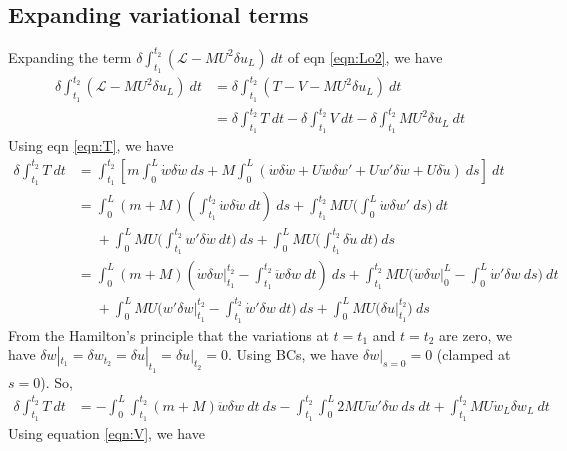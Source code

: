 \documentclass[12pt]{report}
\begin{document}
\subsection{Expanding variational terms}
Expanding the term $\delta \int_{t_1}^{t_2} (\mathcal{L} - MU^2\delta u_L)~dt$ of eqn \ref{eqn:Lo2}, we have
\begin{align*}
  \delta \int_{t_1}^{t_2} (\mathcal{L} - MU^2\delta u_L)~dt &= \delta \int_{t_1}^{t_2} (T - V - MU^2\delta u_L)~dt \\
  &= \delta \int_{t_1}^{t_2} T~dt  - \delta \int_{t_1}^{t_2} V~dt - \delta \int_{t_1}^{t_2} MU^2\delta u_L~dt
\end{align*}
Using eqn \ref{eqn:T}, we have
\begin{align*}
 \delta \int_{t_1}^{t_2} T~dt &= \int_{t_1}^{t_2} \left[m \int_0^L \dot{w}\delta \dot{w}~ds + M\int_0^L \left(\dot{w}\delta \dot{w} + U\dot{w}\delta w' + U w'\delta \dot{w} + U\delta \dot{u}\right)~ds \right]~dt \\
  &=   \int_0^L (m + M)\left(\int_{t_1}^{t_2} \dot{w}\delta \dot{w}~dt\right)~ds + \int_{t_1}^{t_2} MU\bigg(\int_0^L \dot{w}\delta w'~ds\bigg)~dt \\
  &\phantom{=} + \int_0^L MU\bigg(\int_{t_1}^{t_2} w'\delta \dot{w}~dt\bigg)~ds  + \int_0^L MU\bigg(\int_{t_1}^{t_2}\delta \dot{u}~dt\bigg)~ds  \\
  &= \int_0^L (m + M) \left(\dot{w}\delta w\bigg|_{t_1}^{t_2} - \int_{t_1}^{t_2} \ddot{w}\delta w~dt\right)~ds + \int_{t_1}^{t_2} MU\bigg(\dot{w}\delta w\bigg|_0^L - \int_0^L \dot{w}'\delta w~ds\bigg)~dt  \\
  &\phantom{=} + \int_0^L MU\bigg(w'\delta w\bigg|_{t_1}^{t_2} - \int_{t_1}^{t_2} \dot{w}'\delta w~dt\bigg)~ds + \int_0^L MU\bigg(\delta u\bigg|_{t_1}^{t_2}\bigg)~ds 
\end{align*}
From the Hamilton's principle that the variations at $t=t_1$ and $t=t_2$ are zero, we have $\delta w|_{t_1} = \delta w_{t_2} = \delta u|_{t_1} = \delta u|_{t_2} = 0$. Using BCs, we have $\delta w|_{s = 0} = 0$ (clamped at $s=0$). So,
\begin{align}
\delta \int_{t_1}^{t_2} T~dt &= -\int_0^L\int_{t_1}^{t_2} (m + M) \ddot{w}\delta w~dt~ds - \int_{t_1}^{t_2}\int_0^L 2MU\dot{w}'\delta w~ds~dt  + \int_{t_1}^{t_2} MU\dot{w}_L\delta w_L~dt  \label{eqn:variation-in-T}
\end{align}
Using equation \ref{eqn:V}, we have
\end{document}
